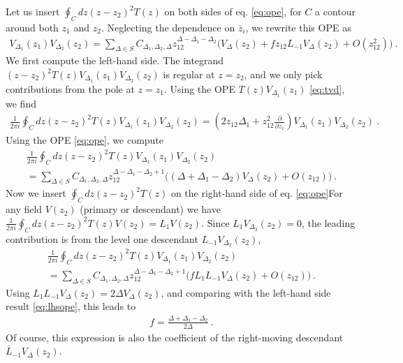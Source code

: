 \documentclass[12pt, a4paper]{article}
\theoremstyle{break}
\begin{document}
Let us insert $\oint_C dz(z-z_2)^2 T(z)$ on both sides of eq. \eqref{eq:ope}, for $C$ a contour around both $z_1$ and $z_2$. Neglecting the dependence on $\bar z_i$, we rewrite this OPE as 
\begin{align}
 V_{\Delta_1}(z_1) V_{\Delta_2}(z_2) 
 = \sum_{\Delta\in S} C_{\Delta_1,\Delta_2,\Delta} z_{12}^{\Delta-\Delta_1-\Delta_2}
 \Big(V_{\Delta}(z_2) + f z_{12} L_{-1}V_{\Delta}(z_2) + O(z_{12}^2) \Big)\ .
\end{align}
We first compute the left-hand side. The integrand $(z-z_2)^2 T(z) V_{\Delta_1}(z_1)V_{\Delta_2}(z_2)$ is regular at $z=z_2$, and we only pick contributions from the pole at $z=z_1$. Using the OPE $T(z)V_{\Delta_1}(z_1)$ \eqref{eq:tvd}, we find 
\begin{align}
 \frac{1}{2\pi i}\oint_C dz(z-z_2)^2 T(z)V_{\Delta_1}(z_1)V_{\Delta_2}(z_2) = \left(2z_{12}\Delta_1+z_{12}^2\frac{\partial}{\partial z_1}\right) V_{\Delta_1}(z_1) V_{\Delta_2}(z_2)\ .
\end{align}
Using the OPE \eqref{eq:ope}, we compute 
\begin{multline}
 \frac{1}{2\pi i}\oint_C dz(z-z_2)^2 T(z)V_{\Delta_1}(z_1)V_{\Delta_2}(z_2)
 \\
 = \sum_{\Delta\in S} C_{\Delta_1,\Delta_2,\Delta} z_{12}^{\Delta-\Delta_1-\Delta_2+1} 
 \Big( (\Delta+\Delta_1-\Delta_2)V_{\Delta}(z_2) + O(z_{12}) \Big)\ .
 \label{eq:lhsope}
\end{multline}
Now we insert $\oint_C dz(z-z_2)^2 T(z)$ on the right-hand side of eq. \eqref{eq:ope}For any field $V(z_2)$ (primary or descendant) we have $\frac{1}{2\pi i}\oint_C dz(z-z_2)^2 T(z)V(z_2) = L_1 V(z_2)$. Since $L_1 V_{\Delta_2}(z_2)=0$, the leading contribution is from the level one descendant $L_{-1} V_{\Delta_2}(z_2)$,
\begin{multline}
 \frac{1}{2\pi i}\oint_C dz(z-z_2)^2 T(z)V_{\Delta_1}(z_1)V_{\Delta_2}(z_2)
 \\
 = \sum_{\Delta\in S} C_{\Delta_1,\Delta_2,\Delta} z_{12}^{\Delta-\Delta_1-\Delta_2+1} 
 \Big( f L_1L_{-1}V_{\Delta}(z_2) + O(z_{12}) \Big)\ .
\end{multline}
Using $L_1L_{-1}V_{\Delta}(z_2)=2\Delta V_\Delta(z_2)$, and comparing with the left-hand side result \eqref{eq:lhsope}, this leads to 
\begin{align}
 f = \frac{\Delta+\Delta_1-\Delta_2}{2\Delta}\ .
\end{align}
Of course, this expression is also the coefficient of the right-moving descendant $\bar L_{-1} V_\Delta(z_2)$.
\end{document}
